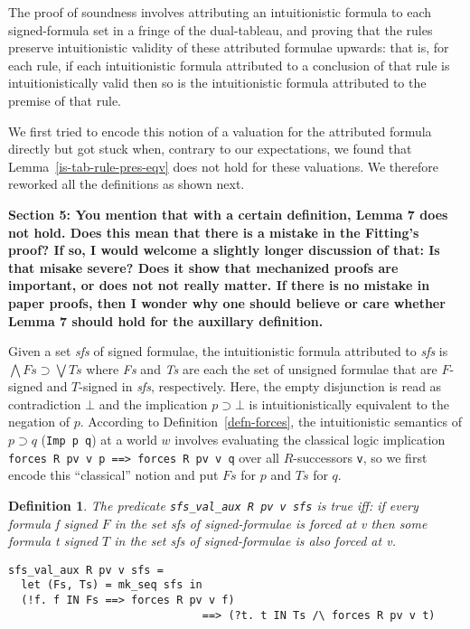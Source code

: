 \documentclass[a4paper]{article}
\newtheorem{definition}{Definition}
\begin{document}

The proof of soundness involves attributing an intuitionistic formula
to each signed-formula set in a fringe of the dual-tableau, and proving
that the rules preserve intuitionistic validity of these attributed
formulae upwards: that is, for each rule, if each intuitionistic
formula attributed to a conclusion of that rule is intuitionistically
valid then so is the intuitionistic formula attributed to the premise
of that rule.

We first tried to encode this notion of a valuation for the
attributed formula directly but got
stuck when, contrary to our expectations, we found that
Lemma~\ref{is-tab-rule-pres-eqv} does not hold for these
valuations. We therefore reworked all the definitions as shown next.

\textbf{Section 5: You mention that with a certain definition, Lemma 7 does not hold.
Does this mean that there is a mistake in the Fitting’s proof? If so, I would
welcome a slightly longer discussion of that: Is that misake severe? Does it
show that mechanized proofs are important, or does not not really matter.
If there is no mistake in paper proofs, then I wonder why one should believe or
care whether Lemma 7 should hold for the auxillary definition.
}

Given a set \textit{sfs} of signed formulae, the intuitionistic
formula attributed to \textit{sfs} is
$\bigwedge Fs \supset \bigvee Ts$ where \textit{Fs} and \textit{Ts}
are each the set of unsigned formulae that are $F$-signed and
$T$-signed in \textit{sfs}, respectively.  Here, 
the empty disjunction is read as contradiction $\bot$ and 
the implication $p \supset \bot$ is intuitionistically equivalent to
the negation of $p$.
According to
Definition~\ref{defn-forces}, the intuitionistic semantics of
$p \supset q$ (\texttt{Imp p q}) at a world $w$
involves evaluating the classical
logic implication \texttt{forces R pv v p ==> forces R pv v q} over
all $R$-successors
\texttt{v}, so we first encode this ``classical'' notion and put
$Fs$ for $p$ and $Ts$ for $q$.

\begin{definition}
The predicate \texttt{sfs\_val\_aux R pv v sfs} is true iff: if every
formula \textit{f} signed $F$ in the set \textit{sfs} of signed-formulae
is forced at \textit{v} then some formula \textit{t} signed $T$ in the
set \textit{sfs} of signed-formulae is also forced at \textit{v}. 
\begin{verbatim}
sfs_val_aux R pv v sfs =
  let (Fs, Ts) = mk_seq sfs in 
  (!f. f IN Fs ==> forces R pv v f) 
                              ==> (?t. t IN Ts /\ forces R pv v t)
\end{verbatim}
\end{definition}
\end{document}
